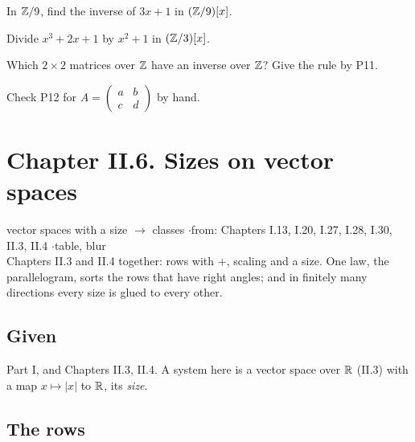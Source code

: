 \begin{lines}
\item[\lab{E1}] In $\mathbb{Z}/9$, find the inverse of $3x + 1$ in $(\mathbb{Z}/9)[x]$.
\item[\lab{E2}] Divide $x^3 + 2x + 1$ by $x^2 + 1$ in $(\mathbb{Z}/3)[x]$.
\item[\lab{E3}] Which $2 \times 2$ matrices over $\mathbb{Z}$ have an inverse over $\mathbb{Z}$? Give the rule by P11.
\item[\lab{E4}] Check P12 for $A = \begin{pmatrix} a & b \\ c & d \end{pmatrix}$ by hand.
\end{lines}

\newpage

\section*{Chapter II.6. Sizes on vector spaces}
\begin{center}
{\normalsize vector spaces with a size $\to$ classes \quad$\cdot$\quad from: Chapters I.13, I.20, I.27, I.28, I.30, II.3, II.4 \quad$\cdot$\quad table, blur}\\[4pt]
{\small Chapters II.3 and II.4 together: rows with $+$, scaling and a size. One law, the parallelogram, sorts the rows that have right angles; and in finitely many directions every size is glued to every other.}
\end{center}

\subsection*{Given}

Part I, and Chapters II.3, II.4. A system here is a vector space over $\mathbb{R}$ (II.3) with a map $x \mapsto |x|$ to $\mathbb{R}$, its \emph{size}.

\subsection*{The rows}

